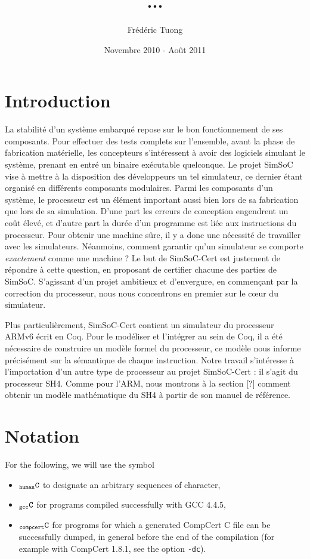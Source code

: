 \documentclass[a4paper, 11pt]{article}
\author{Frédéric Tuong}
\title{...}
\date{Novembre 2010 - Août 2011}
\newcommand{\C}{$_{\tt compcert}{\tt C}$\xspace}
\newcommand{\gccC}{$_{\tt gcc}{\tt C}$\xspace}
\newcommand{\hC}{$_{\tt human}{\tt C}$\xspace}
\begin{document}
\maketitle

\section{Introduction}
La stabilité d'un système embarqué repose sur le bon fonctionnement de ses composants. Pour effectuer des tests complets sur l'ensemble, avant la phase de fabrication matérielle, les concepteurs s'intéressent à avoir des logiciels simulant le système, prenant en entré un binaire exécutable quelconque. Le projet SimSoC vise à mettre à la disposition des développeurs un tel simulateur, ce dernier étant organisé en différents composants modulaires. Parmi les composants d'un système, le processeur est un élément important aussi bien lors de sa fabrication que lors de sa simulation. D'une part les erreurs de conception engendrent un coût élevé, et d'autre part la durée d'un programme est liée aux instructions du processeur. Pour obtenir une machine sûre, il y a donc une nécessité de travailler avec les simulateurs. Néanmoins, comment garantir qu'un simulateur se comporte \emph{exactement} comme une machine ?
Le but de SimSoC-Cert est justement de répondre à cette question, en proposant de certifier chacune des parties de SimSoC. S'agissant d'un projet ambitieux et d'envergure, en commençant par la correction du processeur, nous nous concentrons en premier sur le c\oe ur du simulateur. 

Plus particulièrement, SimSoC-Cert contient un simulateur du processeur ARMv6 écrit en Coq. Pour le modéliser et l'intégrer au sein de Coq, il a été nécessaire de construire un modèle formel du processeur, ce modèle nous informe précisément sur la sémantique de chaque instruction. 
Notre travail s'intéresse à l'importation d'un autre type de processeur au projet SimSoC-Cert : il s'agit du processeur SH4. Comme pour l'ARM, nous montrons à la section [?] comment obtenir un modèle mathématique du SH4 à partir de son manuel de référence.

\section*{Notation}
For the following, we will use the symbol 
\begin{itemize}
\item \hC to designate an arbitrary sequences of character, 
\item \gccC for programs compiled successfully with GCC 4.4.5,
\item \C for programs for which a generated CompCert C file can be successfully dumped, in general before the end of the compilation (for example with CompCert 1.8.1, see the option \verb|-dc|).
\end{itemize}
\end{document}

